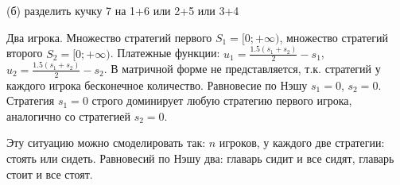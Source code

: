 \begin{solution}{3.15}

\end{solution}
\begin{solution}{3.16}
(б) разделить кучку 7 на 1+6 или 2+5 или 3+4
\end{solution}
\begin{solution}{3.17}

\end{solution}
\begin{solution}{3.18}

\end{solution}
\begin{solution}{3.19}

\end{solution}
\begin{solution}{3.20}

\end{solution}
\begin{solution}{3.21}

\end{solution}
\begin{solution}{3.22}

\end{solution}
\begin{solution}{3.23}

\end{solution}
\begin{solution}{3.24}

\end{solution}
\begin{solution}{3.25}

\end{solution}
\begin{solution}{4.2}
\end{solution}
\begin{solution}{4.3}
\end{solution}
\begin{solution}{4.4}
Два игрока. Множество стратегий первого $S_{1}=[0;+\infty)$, множество стратегий второго $S_{2}=[0;+\infty)$. Платежные функции: $u_{1}=\frac{1.5(s_{1}+s_{2})}{2}-s_{1}$,  $u_{2}=\frac{1.5(s_{1}+s_{2})}{2}-s_{2}$. В матричной форме не представляется, т.к. стратегий у каждого игрока бесконечное количество. Равновесие по Нэшу $s_{1}=0$, $s_{2}=0$. Стратегия $s_{1}=0$ строго доминирует любую стратегию первого игрока, аналогично со стратегией $s_{2}=0$.
\end{solution}
\begin{solution}{4.5}
Эту ситуацию можно смоделировать так: $n$ игроков, у каждого две стратегии: стоять или сидеть. Равновесий по Нэшу два: главарь сидит и все сидят, главарь стоит и все стоят.
\end{solution}
